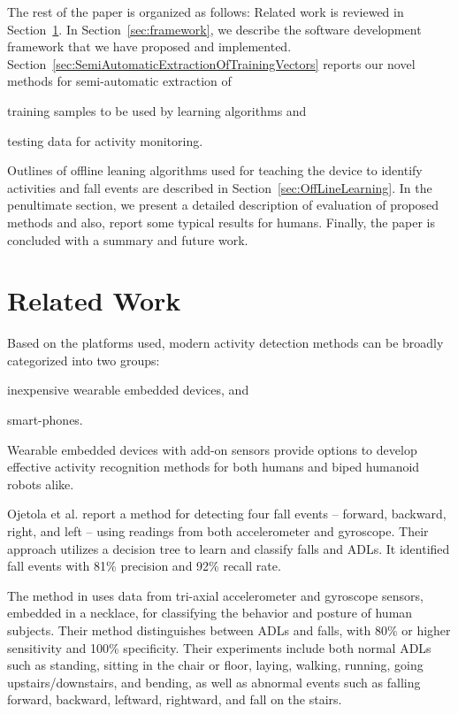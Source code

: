 \documentclass[]{IEEEtran}
\begin{document}
The rest of the paper is organized as follows: Related work is reviewed in
Section~\ref{subSec:relatedWork}. In Section~\ref{sec:framework}, we describe
the software development framework that we have proposed and implemented.
Section~\ref{sec:SemiAutomaticExtractionOfTrainingVectors} reports our novel
methods for  semi-automatic extraction  of \begin{inparaenum} [($i$)] \item
training samples to be used by  learning algorithms  and \item testing data for
activity monitoring.  \end{inparaenum} Outlines of offline leaning algorithms
used for teaching the device to identify activities and fall events are
described in Section~\ref{sec:OffLineLearning}.  In the penultimate section, we
present a detailed description of evaluation of proposed methods and also,
report some typical results for humans. Finally, the paper is concluded with a
summary and future work.  

\section{Related Work}
\label{subSec:relatedWork}

Based on the platforms used, modern activity detection methods can be broadly
categorized into two groups: \begin{inparaenum}[($i$)] \item inexpensive
wearable embedded devices, and \item smart-phones.  \end{inparaenum} Wearable
embedded devices with add-on sensors provide options to develop effective
activity recognition methods for both humans and biped humanoid robots alike. 

\par Ojetola et al. \cite{ojetolaFallDetection2011} report a method for detecting
four fall events -- forward, backward, right, and left -- using readings from both 
accelerometer and gyroscope. Their approach utilizes a decision tree to learn
and classify falls and ADLs. It identified fall events with 81\% precision and
92\% recall rate. 

The method  in\cite{baekFallDetection2013} uses  data from tri-axial
accelerometer  and  gyroscope  sensors, embedded in a necklace, for classifying
the  behavior  and  posture  of  human subjects. Their method distinguishes
between ADLs and  falls, with 80\%  or higher sensitivity  and  100\%
specificity. Their experiments include both normal ADLs such as standing,
sitting in the chair or floor, laying, walking, running, going
upstairs/downstairs, and bending, as well as abnormal events such as falling
forward, backward, leftward, rightward, and fall on the stairs. 
 
\end{document}

